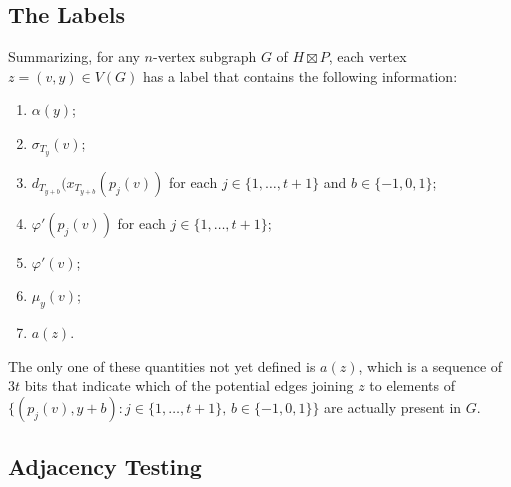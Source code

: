 \documentclass[kpfonts]{patmorin}
\begin{document}
\subsection{The Labels}

Summarizing, for any $n$-vertex subgraph $G$ of $H\boxtimes P$, each vertex $z=(v,y)\in V(G)$ has a label that contains the following information:

\begin{enumerate}[(PC1)]
  \item $\alpha(y)$; %
  \item $\sigma_{T_y}(v)$; %
  \item $d_{T_{y+b}}(x_{T_{y+b}}(p_j(v))$ for each $j\in\{1,\ldots,t+1\}$ and $b\in\{-1,0,1\}$; 
  \item $\varphi'(p_j(v))$ for each $j\in\{1,\ldots,t+1\}$;
  \item $\varphi'(v)$;
  \item $\mu_y(v)$;
  \item $a(z)$.
\end{enumerate}
The only one of these quantities not yet defined is $a(z)$, which is a sequence of $3t$ bits that indicate which of the potential edges joining $z$ to elements of $\{(p_j(v),y+b): j\in\{1,\ldots,t+1\},\, b\in\{-1,0,1\}\}$ are actually present in $G$.

\subsection{Adjacency Testing}
\end{document}

